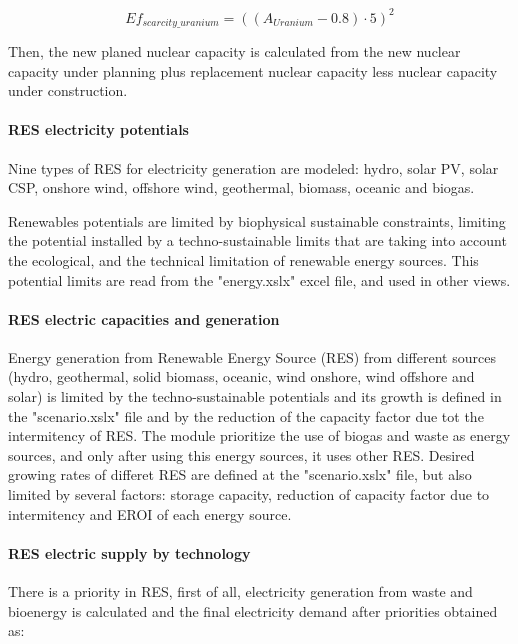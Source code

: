 \begin{equation}
Ef_{scarcity\_uranium}=  ((A_{Uranium}-0.8) \cdot 5)^2
\end{equation}

Then, the new planed nuclear capacity is calculated from the new nuclear capacity under planning plus replacement nuclear capacity less nuclear capacity under construction.


\paragraph{RES electricity potentials}

Nine types of RES for electricity generation are modeled: hydro, solar PV, solar CSP, onshore wind, offshore wind, geothermal, biomass, oceanic and biogas.

Renewables potentials are limited by biophysical sustainable constraints, limiting the potential installed by a techno-sustainable limits that are taking into account the ecological, and the technical limitation of renewable energy sources. This potential limits are read from the "energy.xslx" excel file, and used in other views.

\paragraph{RES electric capacities and generation}

Energy generation from Renewable Energy Source (RES) from different sources (hydro, geothermal, solid biomass, oceanic, wind onshore, wind offshore and solar) is limited by the techno-sustainable potentials and its growth is defined in the "scenario.xslx" file and by the reduction of the capacity factor due tot the intermitency of RES. The module prioritize the use of biogas and waste as energy sources, and only after using this energy sources, it uses other RES. Desired growing rates of differet RES are defined at the "scenario.xslx" file, but also limited by several factors: storage capacity, reduction of capacity factor due to intermitency and EROI of each energy source.

\paragraph{RES electric supply by technology}

There is a priority in RES, first of all, electricity generation from waste and bioenergy is calculated and the final electricity demand after priorities obtained as:

